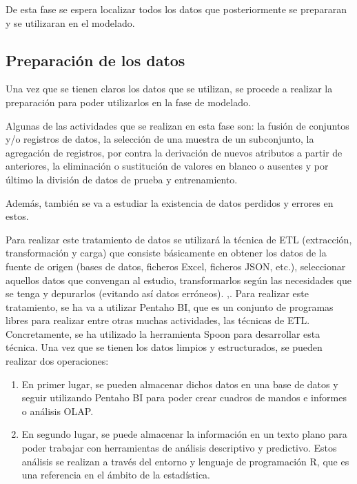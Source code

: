 De esta fase se espera localizar todos los datos que posteriormente se prepararan y se utilizaran en el modelado.

\subsection{Preparación de los datos}
Una vez que se tienen claros los datos que se utilizan, se procede a realizar la preparación para poder utilizarlos en la fase de modelado.

Algunas de las actividades que se realizan en esta fase son: la fusión de conjuntos y/o registros de datos, la selección de una muestra de un subconjunto, la agregación de registros, por contra la derivación de nuevos atributos a partir de anteriores, la eliminación o sustitución de valores en blanco o ausentes y por último la división de datos de prueba y entrenamiento.

Además, también se va a estudiar la existencia de datos perdidos y errores en estos.

Para realizar este tratamiento de datos se utilizará la técnica de ETL (extracción, transformación y carga) que consiste básicamente en obtener los datos de la fuente de origen (bases de datos, ficheros Excel, ficheros JSON, etc.), seleccionar aquellos datos que convengan al estudio, transformarlos según las necesidades que se tenga y depurarlos (evitando así datos erróneos). \cite{prakash2017etl} \cite{matos2006metodologia},\cite{gour2010improve}.
Para realizar este tratamiento, se ha va a utilizar Pentaho BI, que es un conjunto de programas libres para realizar entre otras muchas actividades, las técnicas de ETL. Concretamente, se ha utilizado la herramienta Spoon para desarrollar esta técnica. 
Una vez que se tienen los datos limpios y estructurados, se pueden realizar dos operaciones:

\begin{enumerate}
	\item  En primer lugar, se pueden almacenar dichos datos en una base de datos y seguir utilizando Pentaho BI para poder crear cuadros de mandos e informes o análisis OLAP. 
	
	\item  En segundo lugar, se puede almacenar la información en un texto plano para poder trabajar con herramientas de análisis descriptivo y predictivo. Estos análisis se realizan a través del entorno y lenguaje de programación R, que es una referencia en el ámbito de la estadística.
\end{enumerate}

